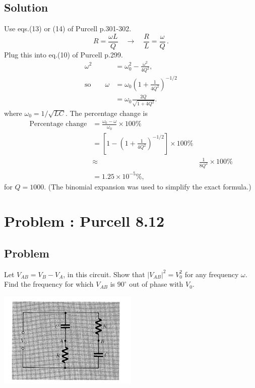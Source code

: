 \documentclass[solutions]{esg8022pset}
\begin{document}
\subsection{Solution}
  Use eqs.(13) or (14) of Purcell p.301-302.
  \begin{equation}
  R=\frac{\omega L}{Q} \quad\to\quad \frac{R}{L}=\frac{\omega}{Q}\,.
  \end{equation}
  Plug this into eq.(10) of Purcell p.299.
  \begin{align}
  \omega^2 & = \omega_0^2-\frac{\omega^2}{4Q^2},\\
  \text{so} \qquad \omega & = \omega_0 \left(1+\frac{1}{4Q^2}\right)^{-1/2}\\
  & = \omega_0\frac{2Q}{\sqrt{1+4Q^2}}.
  \end{align}
  where $\omega_0=1/\sqrt{LC}$.  The percentage change is
  \begin{align}
  \text{Percentage change} & = \frac{\omega_0-\omega}{\omega_0}\times
  100\%\nonumber\\
  & = \left[1-\left(1+\frac{1}{4Q^2}\right)^{-1/2}\right]\times 100\%\nonumber\\
  &\approx & \frac{1}{8Q^2}\times 100\%\nonumber\\
  & = 1.25\times 10^{-5} \%,
  \end{align}
  for $Q=1000$.  (The binomial expansion was used to simplify the exact formula.)

\section{Problem \thesection: Purcell 8.12}
\subsection{Problem}
  Let $V_{AB} = V_B - V_A$, in this circuit.  Show that $|V_{AB}|^2 =
  V_0^2$ for any frequency $\omega$.  Find the frequency for which $V_{AB}$
  is $90^\circ$ out of phase with $V_0$.

  \begin{center}
    \includegraphics[width = 0.5\textwidth]{figpu812}
  \end{center}
\end{document}
